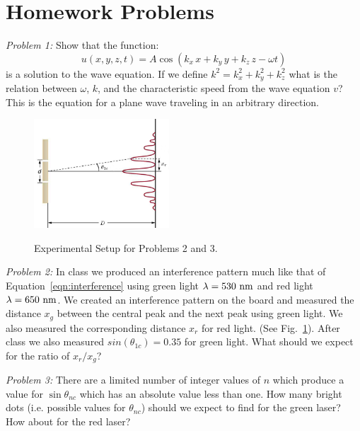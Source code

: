 \documentclass[12pt]{article}
\begin{document}
\newpage
\section{Homework Problems}

\noindent
{\em Problem 1:} Show that the function:
\begin{displaymath}
u(x,y,z,t) = A \cos(k_x \,x + k_y \, y + k_z \, z - \omega t)
\end{displaymath}
is a solution to the wave equation.  If we define $k^2 = k_x^2 + k_y^2 + k_z^2$ what is the relation between $\omega$, $k$, and the characteristic speed from the wave equation $v$?  This is the equation for a plane wave traveling in an arbitrary direction.

\vskip 0.5cm

\begin{figure}[thb]
\begin{center}
{\includegraphics[width=0.45\textwidth]{figs/interference_exp.pdf}}
\end{center}
\caption{\label{fig:setup} Experimental Setup for Problems 2 and 3.}
\end{figure}

\noindent
{\em Problem 2:}   In class we produced an interference pattern much like that of Equation~\ref{eqn:interference} using green light $\lambda = 530~{\rm nm}$ and red light $\lambda = 650~{\rm nm}$.
We created an interference pattern on the board and measured the distance $x_{g}$ between the central peak and the next peak using green light.  We also measured the corresponding distance $x_{r}$ for red light.  (See Fig.~\ref{fig:setup}).  After class we also measured $sin(\theta_{1c}) = 0.35$ for green light.   What should we expect for the ratio of $x_r / x_g$?

\vskip 0.5cm

\noindent
{\em Problem 3:} There are a limited number of integer values of $n$ which produce a value for $\sin \theta_{nc}$ which has an absolute value less than one.  How many bright dots (i.e. possible values for $\theta_{nc}$) should we expect to find for the green laser?  How about for the red laser?
\end{document}
